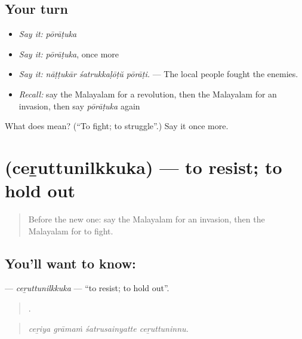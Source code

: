 \subsection*{Your turn}
\begin{itemize}
\raggedright
  \item \emph{Say it:} \emph{pōrāṭuka}
  \item \emph{Say it:} \emph{pōrāṭuka}, once more
  \item \emph{Say it:} \emph{nāṭṭukār śatrukkaḷōṭŭ pōrāṭi.} — The local people fought the enemies.
  \item \emph{Recall:} say the Malayalam for a revolution, then the Malayalam for an invasion, then say \emph{pōrāṭuka} again
\end{itemize}

\begin{tcolorbox}[breakable,colback=teal!4,colframe=teal!35!black,title={Before you move on}]
What does  mean? (\textquotedblleft{}To fight; to struggle\textquotedblright{}.) Say it once more.
\end{tcolorbox}
\section[\texorpdfstring{\ml{ചെറുത്തുനിൽക്കുക} (ceṟuttunilkkuka)}{ചെറുത്തുനിൽക്കുക (ceṟuttunilkkuka)}]{ (ceṟuttunilkkuka) — to resist; to hold out}

\label{lesson:ML-C401-ceruttunilkkuka}



\begin{quote}
Before the new one: say the Malayalam for an invasion, then the Malayalam for to fight.
\end{quote}

\subsection*{You'll want to know: }
\textbf{} — \emph{ceṟuttunilkkuka} — \textquotedblleft{}to resist; to hold out\textquotedblright{}.

\begin{quote}
   .
\end{quote}

\begin{quote}
\emph{ceṟiya grāmaṁ śatrusainyatte ceṟuttuninnu.}
\end{quote}

